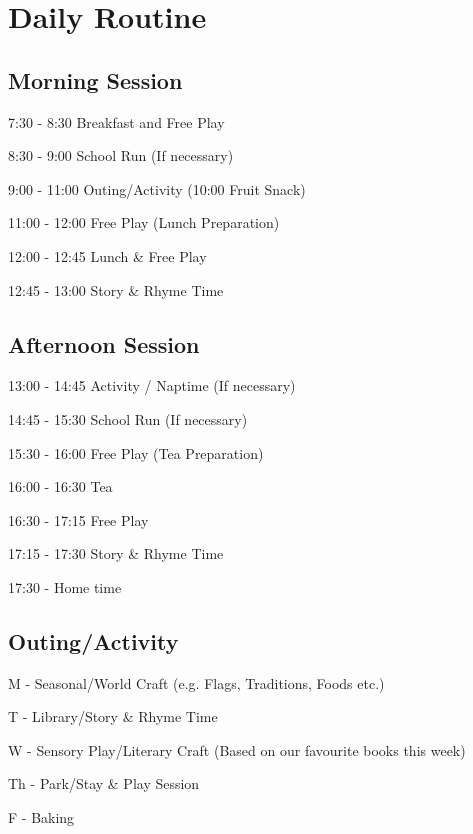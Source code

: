 

\section{Daily Routine}

\subsection{Morning Session}

7:30 - 8:30 Breakfast and Free Play

8:30 - 9:00 School Run (If necessary) 

9:00 - 11:00 Outing/Activity (10:00 Fruit Snack)

11:00 - 12:00 Free Play (Lunch Preparation)

12:00 - 12:45 Lunch \& Free Play

12:45 - 13:00 Story \& Rhyme Time

\subsection{Afternoon Session}

13:00 - 14:45 Activity / Naptime (If necessary)

14:45 - 15:30 School Run (If necessary)

15:30 - 16:00 Free Play (Tea Preparation)

16:00 - 16:30 Tea

16:30 - 17:15 Free Play

17:15 - 17:30 Story \& Rhyme Time

17:30 - Home time

\subsection{Outing/Activity}

M - Seasonal/World Craft (e.g. Flags, Traditions, Foods etc.)

T - Library/Story & Rhyme Time

W - Sensory Play/Literary Craft (Based on our favourite books this week)

Th - Park/Stay \& Play Session

F - Baking


